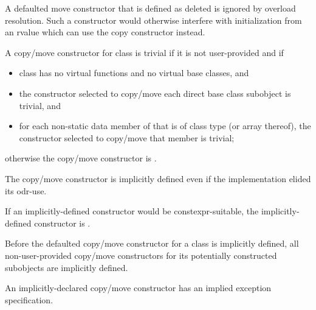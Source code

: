 \begin{note}
A defaulted move constructor that is defined as deleted is ignored by overload
resolution.
Such a constructor would otherwise interfere with initialization from
an rvalue which can use the copy constructor instead.
\end{note}

\pnum
{}%
%
A copy/move constructor for class
is
trivial
if it is not user-provided and if
\begin{itemize}
\item
class
has no virtual functions
and no virtual base classes, and

\item
the constructor selected to copy/move each direct base class subobject is trivial, and

\item
for each non-static data member of
that is of class type (or array thereof),
the constructor selected to copy/move that member is trivial;
\end{itemize}

%
otherwise the copy/move constructor is
.

\pnum
\begin{note}
The copy/move constructor is implicitly defined even if the implementation elided
its odr-use.
\end{note}
If an implicitly-defined constructor would be constexpr-suitable,
the implicitly-defined
constructor is .

\pnum
Before the defaulted copy/move constructor for a class is
implicitly defined,
all non-user-provided copy/move constructors for its
potentially constructed subobjects
are implicitly defined.
\begin{note}
An implicitly-declared copy/move constructor has an
implied exception specification.
\end{note}

